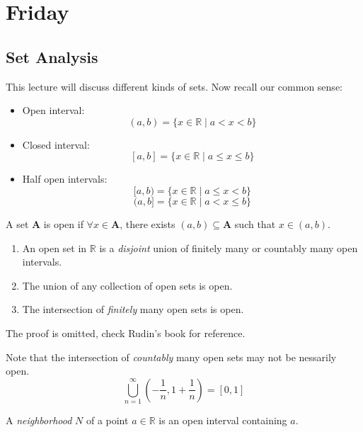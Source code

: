 

\section{Friday}
\subsection{Set Analysis}
This lecture will discuss different kinds of sets. Now recall our common sense:
\begin{definition}[Interval]
\begin{itemize}
\item
Open interval:
\[
(a,b) = \{x\in\mathbb{R}\mid a<x<b\}
\]
\item
Closed interval:
\[
[a,b] = \{x\in\mathbb{R}\mid a\le x\le b\}
\]
\item
Half open intervals:
\[
[a,b)=\{x\in\mathbb{R}\mid a\le x< b\}
\]
\[
(a,b] = \{x\in\mathbb{R}\mid a< x\le b\}
\]
\end{itemize}
\end{definition}
\begin{definition}
A set $\bm A$ is open if $\forall x\in\bm A$, there exists $(a,b)\subseteq\bm A$ such that $x\in(a,b)$.
\end{definition}

\begin{theorem}
\begin{enumerate}
\item
An open set in $\mathbb{R}$ is a \emph{disjoint} union of finitely many or countably many open intervals.
\item
The union of any collection of open sets is open.
\item
The intersection of \emph{finitely} many open sets is open.
\end{enumerate}
\end{theorem}
The proof is omitted, check Rudin's book for reference.
\begin{remark}
Note that the intersection of \emph{countably} many open sets may not be nessarily open.
 \[
 \bigcup_{n=1}^\infty\left(-\frac{1}{n},1+\frac{1}{n}\right)
 =[0,1]
 \]
\end{remark}

\begin{definition}[Neighborhood]
A \emph{neighborhood} $N$ of a point $a\in\mathbb{R}$ is an open interval containing $a$.
\end{definition}

